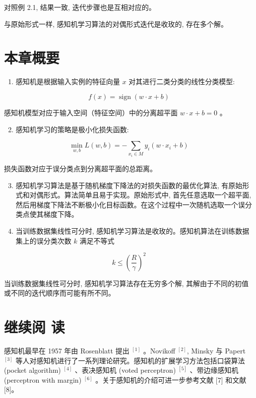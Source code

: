 \documentclass[10pt]{article}
\begin{document}
对照例 2.1, 结果一致, 迭代步骤也是互相对应的。

与原始形式一样, 感知机学习算法的对偶形式迭代是收玫的, 存在多个解。

\section*{本章概要}
\begin{enumerate}
  \item 感知机是根据输入实例的特征向量 $x$ 对其进行二类分类的线性分类模型:
\end{enumerate}

$$
f(x)=\operatorname{sign}(w \cdot x+b)
$$

感知机模型对应于输入空间（特征空间）中的分离超平面 $w \cdot x+b=0$ 。

\begin{enumerate}
  \setcounter{enumi}{1}
  \item 感知机学习的策略是极小化损失函数:
\end{enumerate}

$$
\min _{w, b} L(w, b)=-\sum_{x_{i} \in M} y_{i}\left(w \cdot x_{i}+b\right)
$$

损失函数对应于误分类点到分离超平面的总距离。

\begin{enumerate}
  \setcounter{enumi}{2}
  \item 感知机学习算法是基于随机梯度下降法的对损失函数的最优化算法, 有原始形式和对偶形式。算法简单且易于实现。原始形式中, 首先任意选取一个超平面, 然后用梯度下降法不断极小化目标函数。在这个过程中一次随机选取一个误分类点使其梯度下降。

  \item 当训练数据集线性可分时, 感知机学习算法是收玫的。感知机算法在训练数据集上的误分类次数 $k$ 满足不等式

\end{enumerate}

$$
k \leqslant\left(\frac{R}{\gamma}\right)^{2}
$$

当训练数据集线性可分时, 感知机学习算法存在无穷多个解, 其解由于不同的初值或不同的迭代顺序而可能有所不同。

\section*{继续阅 读}
感知机最早在 1957 年由 Rosenblatt 提出 ${ }^{[1]}$ 。Novikoff ${ }^{[2]}$, Minsky 与 Papert ${ }^{[3]}$ 等人对感知机进行了一系列理论研究。感知机的扩展学习方法包括口袋算法 (pocket algorithm) ${ }^{[4]}$ 、表决感知机 (voted perceptron) ${ }^{[5]}$ 、带边缘感知机 (perceptron with margin) ${ }^{[6]}$ 。关于感知机的介绍可进一步参考文献 [7] 和文献 [8]。
\end{document}
